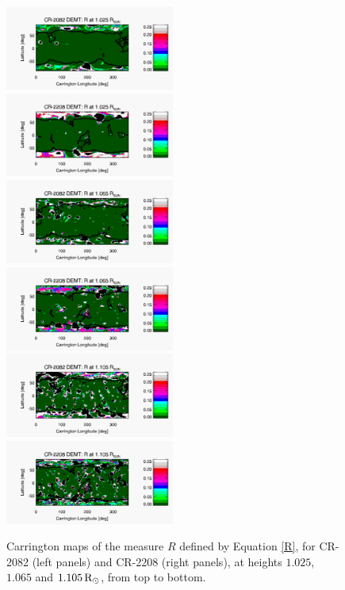 \documentclass[namedreferences]{solarphysics}
\newcommand{\mrsun}{{\rm R_\odot}}
\begin{document}
\begin{article}
\begin{figure}[h!]
\begin{center}
\includegraphics[width=0.495\textwidth]{figs/map_R_CR2082_DEMT-EUVI_behind_H1-L3523_r3d_1025_Rsun.pdf}
\includegraphics[width=0.495\textwidth]{figs/map_R_CR2208_DEMT-AIA_H1_L522_r3d_1025_Rsun.pdf}
\includegraphics[width=0.495\textwidth]{figs/map_R_CR2082_DEMT-EUVI_behind_H1-L3523_r3d_1065_Rsun.pdf}
\includegraphics[width=0.495\textwidth]{figs/map_R_CR2208_DEMT-AIA_H1_L522_r3d_1065_Rsun.pdf}
\includegraphics[width=0.495\textwidth]{figs/map_R_CR2082_DEMT-EUVI_behind_H1-L3523_r3d_1105_Rsun.pdf}
\includegraphics[width=0.495\textwidth]{figs/map_R_CR2208_DEMT-AIA_H1_L522_r3d_1105_Rsun.pdf}
\caption{{Carrington maps of the measure $R$ defined by Equation \ref{R}, for CR-2082 (left panels) and CR-2208 (right panels), at heights $1.025$, $1.065$ and $1.105\,\mrsun$, from top to bottom}. }
\label{carmaps_R_2082_2208}
\end{center}
\end{figure}


\end{article}
\end{document}
